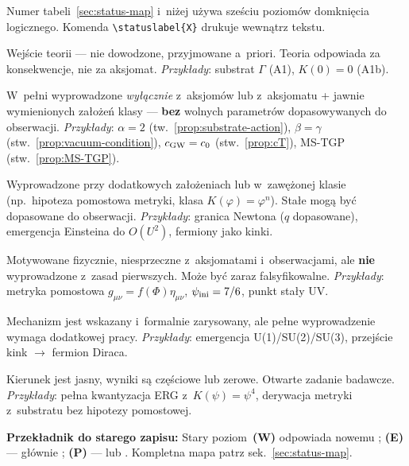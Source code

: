 \begin{remark}\label{rem:status-levels}
Numer tabeli~\ref{sec:status-map} i~ni\.zej u\.zywa
sze\'sciu poziom\'ow domkni\k{e}cia logicznego.
Komenda \verb|\statuslabel{X}| drukuje 
wewn\k{a}trz tekstu.
\begin{description}[nosep,style=nextline]
  \item[\statuslabel{Aksjomat}]
    Wej\'scie teorii --- nie dowodzone, przyjmowane a~priori.
    Teoria odpowiada za konsekwencje, nie za aksjomat.
    \emph{Przyk\l{}ady}: substrat $\Gamma$ (A1), $K(0) = 0$ (A1b).
  \item[\statuslabel{Twierdzenie}]
    W~pe\l{}ni wyprowadzone \emph{wy\l{}\k{a}cznie} z~aksjom\'ow
    lub z~aksjomatu + jawnie wymienionych za\l{}o\.ze\'n klasy ---
    \textbf{bez} wolnych parametr\'ow dopasowywanych do obserwacji.
    \emph{Przyk\l{}ady}: $\alpha = 2$ (tw.~\ref{prop:substrate-action}),
    $\beta = \gamma$ (stw.~\ref{prop:vacuum-condition}), $c_{\rm GW} = c_0$
    (stw.~\ref{prop:cT}), MS-TGP (stw.~\ref{prop:MS-TGP}).
  \item[\statuslabel{Propozycja}]
    Wyprowadzone przy dodatkowych za\l{}o\.zeniach lub
    w~zawężonej klasie (np.\ hipoteza pomostowa metryki, klasa $K(\varphi)=\varphi^n$).
    Sta\l{}e mog\k{a} by\'c dopasowane do obserwacji.
    \emph{Przyk\l{}ady}: granica Newtona ($q$ dopasowane),
    emergencja Einsteina do $O(U^2)$, fermiony jako kinki.
  \item[\statuslabel{Hipoteza}]
    Motywowane fizycznie, niesprzeczne z~aksjomatami i~obserwacjami,
    ale \textbf{nie} wyprowadzone z~zasad pierwszych.
    Mo\.ze by\'c zaraz falsyfikowalne.
    \emph{Przyk\l{}ady}: metryka pomostowa $g_{\mu\nu} = f(\Phi)\eta_{\mu\nu}$,
    $\psi_{\rm ini} = 7/6$, punkt sta\l{}y UV.
  \item[\statuslabel{Szkic}]
    Mechanizm jest wskazany i~formalnie zarysowany,
    ale pe\l{}ne wyprowadzenie wymaga dodatkowej pracy.
    \emph{Przyk\l{}ady}: emergencja U(1)/SU(2)/SU(3),
    przej\'scie kink $\to$ fermion Diraca.
  \item[\statuslabel{Program}]
    Kierunek jest jasny, wyniki s\k{a} cz\k{e}\'sciowe lub zerowe.
    Otwarte zadanie badawcze.
    \emph{Przyk\l{}ady}: pe\l{}na kwantyzacja ERG z~$K(\psi) = \psi^4$,
    derywacja metryki z~substratu bez hipotezy pomostowej.
\end{description}

\medskip\noindent
\textbf{Przek\l{}adnik do starego zapisu:}
Stary poziom~\textbf{(W)} odpowiada nowemu ;
\textbf{(E)} --- g\l{}\'ownie ;
\textbf{(P)} ---  lub .
Kompletna mapa patrz sek.~\ref{sec:status-map}.


\end{remark}
